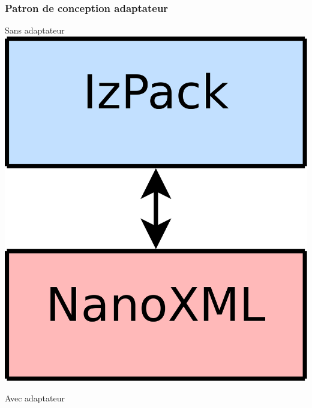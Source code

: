 \begin{frame}
\frametitle{Patron de conception adaptateur}
\hfil
\begin{minipage}[c]{.3\linewidth}
	\begin{beamerboxesrounded}[shadow=true]{Sans adaptateur}
		\centering
		\includegraphics[width=.8\linewidth]{../image/sansAdaptateur.png}
	\end{beamerboxesrounded}
\end{minipage}
\hfil
\begin{minipage}[c]{.3\linewidth}
	\begin{beamerboxesrounded}[shadow=true]{Avec adaptateur}
		\centering

\end{beamerboxesrounded}
\end{minipage}
\end{frame}
